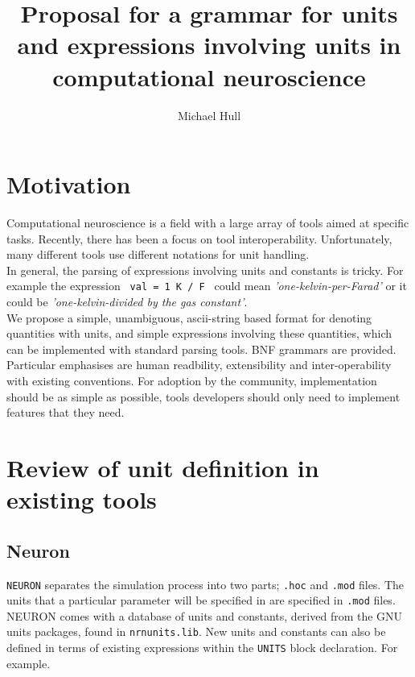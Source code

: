 \documentclass{article}
\title{Proposal for a  grammar for units and expressions involving units in computational neuroscience}
\author{Michael Hull}
\begin{document}
\maketitle

\tableofcontents

\section{Motivation}

Computational neuroscience is a field with a large 
array of tools aimed at specific tasks. Recently, 
there has been a focus on tool interoperability. 
Unfortunately, many different tools use different 
notations for unit handling.\\


In general, the parsing of expressions involving units and constants is tricky. For example the expression
\verb| val = 1 K / F | could mean \emph{'one-kelvin-per-Farad'} or it could be \emph{'one-kelvin-divided by the gas constant'}. \\

We propose a simple, unambiguous, ascii-string based format for denoting quantities with units, and simple expressions involving these quantities, which can be implemented with standard parsing tools. BNF grammars are provided.  Particular emphasises are human readbility, extensibility and inter-operability with existing conventions.  For adoption by the community, implementation should be as simple as possible, tools developers should only need to implement features that they need.  



\newpage
\section{Review  of unit definition in existing tools}

\subsection*{Neuron}
\verb|NEURON| separates the simulation process into two parts; \verb|.hoc| and \verb|.mod| files. The units that a particular parameter will be specified in are specified in \verb|.mod| files. NEURON comes with a database of units and constants, derived from the GNU units packages, found in \verb|nrnunits.lib|. New units and constants can also be defined in terms of existing expressions within the \verb|UNITS| block declaration. For example.
\end{document}
